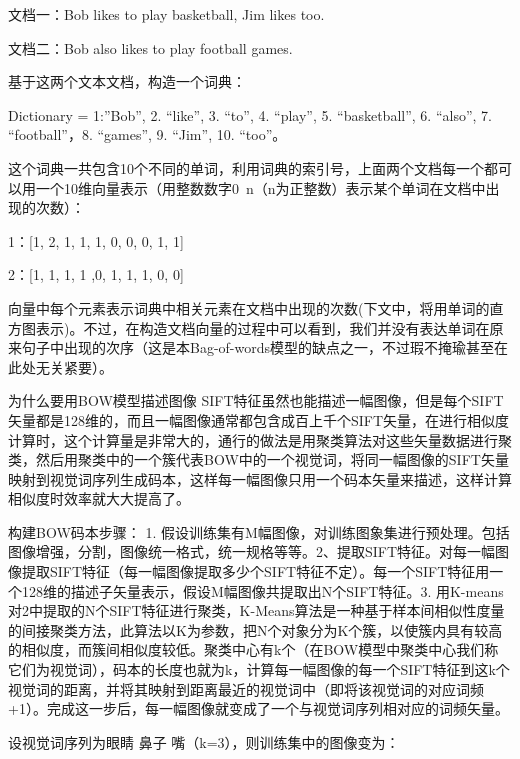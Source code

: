 \documentclass[10pt,a4paper]{ctexbook}
\begin{document}
 

文档一：Bob likes to play basketball, Jim likes too.

文档二：Bob also likes to play football games.

 

基于这两个文本文档，构造一个词典：

Dictionary = {1:”Bob”, 2. “like”, 3. “to”, 4. “play”, 5. “basketball”, 6. “also”, 7. “football”，8. “games”, 9. “Jim”, 10. “too”}。

 

这个词典一共包含10个不同的单词，利用词典的索引号，上面两个文档每一个都可以用一个10维向量表示（用整数数字0~n（n为正整数）表示某个单词在文档中出现的次数）：

1：[1, 2, 1, 1, 1, 0, 0, 0, 1, 1]

2：[1, 1, 1, 1 ,0, 1, 1, 1, 0, 0]

 

向量中每个元素表示词典中相关元素在文档中出现的次数(下文中，将用单词的直方图表示)。不过，在构造文档向量的过程中可以看到，我们并没有表达单词在原来句子中出现的次序（这是本Bag-of-words模型的缺点之一，不过瑕不掩瑜甚至在此处无关紧要）。

 

为什么要用BOW模型描述图像
SIFT特征虽然也能描述一幅图像，但是每个SIFT矢量都是128维的，而且一幅图像通常都包含成百上千个SIFT矢量，在进行相似度计算时，这个计算量是非常大的，通行的做法是用聚类算法对这些矢量数据进行聚类，然后用聚类中的一个簇代表BOW中的一个视觉词，将同一幅图像的SIFT矢量映射到视觉词序列生成码本，这样每一幅图像只用一个码本矢量来描述，这样计算相似度时效率就大大提高了。

 

构建BOW码本步骤：
1. 假设训练集有M幅图像，对训练图象集进行预处理。包括图像增强，分割，图像统一格式，统一规格等等。2、提取SIFT特征。对每一幅图像提取SIFT特征（每一幅图像提取多少个SIFT特征不定）。每一个SIFT特征用一个128维的描述子矢量表示，假设M幅图像共提取出N个SIFT特征。3. 用K-means对2中提取的N个SIFT特征进行聚类，K-Means算法是一种基于样本间相似性度量的间接聚类方法，此算法以K为参数，把N个对象分为K个簇，以使簇内具有较高的相似度，而簇间相似度较低。聚类中心有k个（在BOW模型中聚类中心我们称它们为视觉词），码本的长度也就为k，计算每一幅图像的每一个SIFT特征到这k个视觉词的距离，并将其映射到距离最近的视觉词中（即将该视觉词的对应词频+1）。完成这一步后，每一幅图像就变成了一个与视觉词序列相对应的词频矢量。

 

设视觉词序列为{眼睛 鼻子 嘴}（k=3），则训练集中的图像变为：
\end{document}
